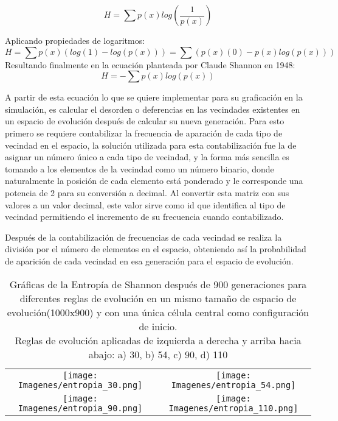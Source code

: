 \documentclass[]{article}
\begin{document}
				$$
				H = \sum p(x) log\left(\frac{1}{p(x)}\right)
				$$
				
				Aplicando propiedades de logaritmos:
				$$
				H = \sum p(x)( log(1) - log(p(x)) ) = \sum(p(x)(0) - p(x)log(p(x)))
				$$
				Resultando finalmente en la ecuación planteada por Claude Shannon en 1948:
				$$
				H = -\sum p(x) log(p(x))
				$$
				
				\hfill\break
				\justifying
				A partir de esta ecuación lo que se quiere implementar para su graficación en la simulación, es calcular el desorden o deferencias en las vecindades existentes en un espacio de evolución después de calcular su nueva generación. Para esto primero se requiere contabilizar la frecuencia de aparación de cada tipo de vecindad en el espacio, la solución utilizada para esta contabilización fue la de asignar un número único a cada tipo de vecindad, y la forma más sencilla es tomando a los elementos de la vecindad como un número binario, donde naturalmente la posición de cada elemento está ponderado y le corresponde una potencia de 2 para su conversión a decimal. Al convertir esta matriz con sus valores a un valor decimal, este valor sirve como id que identifica al tipo de vecindad permitiendo el incremento de su frecuencia cuando contabilizado.
				
				\hfill\break
				\justifying
				Después de la contabilización de frecuencias de cada vecindad se realiza la división por el número de elementos en el espacio, obteniendo así la probabilidad de aparición de cada vecindad en esa generación para el espacio de evolución.
				
				\begin{table}[!h]
					\centering
					\begin{tabular}{c c}
						\texttt{[image: Imagenes/entropia\_30.png]} & \texttt{[image: Imagenes/entropia\_54.png]} \\
						\texttt{[image: Imagenes/entropia\_90.png]} & \texttt{[image: Imagenes/entropia\_110.png]} 
					\end{tabular}
					\caption{Gráficas de la Entropía de Shannon después de 900 generaciones para diferentes reglas de evolución en un mismo tamaño de espacio de evolución(1000x900) y con una única célula central como configuración de inicio.\\ Reglas de evolución aplicadas de izquierda a derecha y arriba hacia abajo: a) 30, b) 54, c) 90, d) 110}
				\end{table}
			
\end{document}

